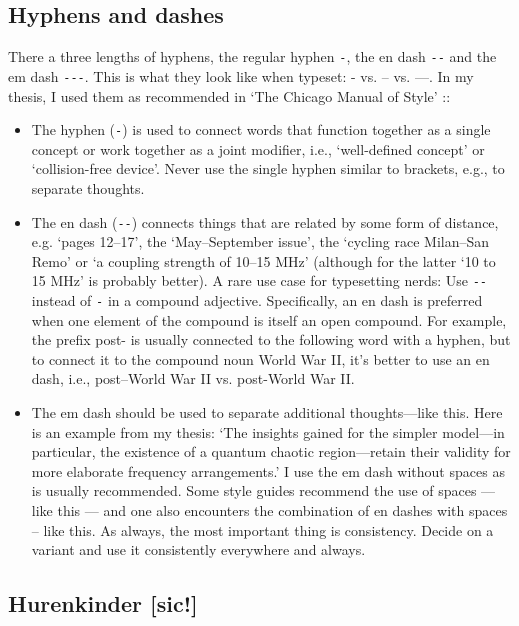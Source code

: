 \subsection{Hyphens and dashes}
There a three lengths of hyphens, the regular hyphen \verb|-|, the en dash \verb|--| and the em dash \verb|---|.
This is what they look like when typeset: - vs. -- vs. ---.
In my thesis, I used them as recommended in `The Chicago Manual of Style' \cite{chicagoMOS}::
\begin{itemize}
\item The hyphen (\verb|-|) is used to connect words that function together as a single concept or work together as a joint modifier, i.e., `well-defined concept' or `collision-free device'. Never use the single hyphen similar to brackets, e.g., to separate thoughts.
\item The en dash (\verb|--|) connects things that are related by some form of distance, e.g. `pages 12--17', the `May--September issue', the `cycling race Milan--San Remo' or `a coupling strength of 10--15 MHz' (although for the latter `10 to 15 MHz' is probably better). A rare use case for typesetting nerds: Use \verb|--| instead of \verb|-| in a compound adjective. Specifically, an en dash is preferred when one element of the compound is itself an open compound. For example, the prefix post- is usually connected to the following word with a hyphen, but to connect it to the compound noun World War II, it's better to use an en dash, i.e., post--World War II vs. post-World War II.
\item The em dash should be used to separate additional thoughts---like this. Here is an example from my thesis: `The insights gained for the simpler model---in particular, the existence of a quantum chaotic region---retain their validity for more elaborate frequency arrangements.' I use the em dash without spaces as is usually recommended. Some style guides recommend the use of spaces --- like this --- and one also encounters the combination of en dashes with spaces -- like this. As always, the most important thing is consistency. Decide on a variant and use it consistently everywhere and always.
\end{itemize}

\subsection{Hurenkinder [sic!]}

